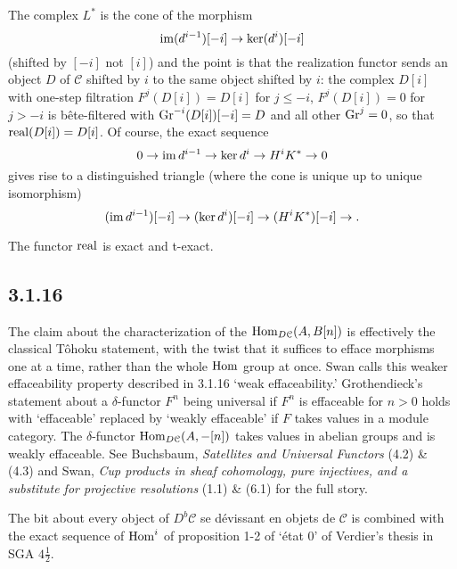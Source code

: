 \documentclass[deligne.tex]{subfiles}
\begin{document}
The complex $L^*$ is the cone of the morphism
\begin{equation*}
	\operatorname{im}(d^{i-1})[-i]\rightarrow\ker(d^i)[-i]
\end{equation*}
(shifted by $[-i]$ not $[i]$) and the point is that the realization functor
sends an object $D$ of $\mathcal C$ shifted by $i$ to the same object 
shifted by $i$: the complex $D[i]$ with one-step filtration
$F^j(D[i])=D[i]$ for $j\leq-i$, $F^j(D[i])=0$ for $j>-i$ is
bête-filtered with $\operatorname{Gr}^{-i}(D[i])[-i]=D$ and all other $\operatorname{Gr}^j=0$, so that
$\operatorname{real}(D[i])=D[i]$. Of course, the exact sequence
\begin{equation*}
	0\rightarrow\operatorname{im} d^{i-1}\rightarrow\ker d^i\rightarrow H^iK^*\rightarrow 0
\end{equation*}
gives rise to a distinguished triangle (where the cone is unique up to
unique isomorphism)
\begin{equation*}
	(\operatorname{im} d^{i-1})[-i]\rightarrow(\ker d^i)[-i]\rightarrow (H^iK^*)[-i]\rightarrow.
\end{equation*}
\begin{remark}
	The functor $\operatorname{real}$ is exact and t-exact.
\end{remark}

\subsection*{3.1.16}
The claim about the characterization of the $\operatorname{Hom}_{D\mathcal C}(A,B[n])$
is effectively the classical Tôhoku statement, with the twist that it
suffices to efface morphisms one at a time, rather than the whole $\operatorname{Hom}$
group at once. Swan calls this weaker effaceability property described in
3.1.16 `weak effaceability.'
Grothendieck's statement about a $\delta$-functor $F^n$ being universal if
$F^n$ is effaceable for $n>0$ holds with `effaceable' replaced by `weakly
effaceable' if $F$ takes values in a module category. The $\delta$-functor
$\operatorname{Hom}_{D\mathcal C}(A,-[n])$ takes values in abelian groups and is weakly
effaceable.
See Buchsbaum, \emph{Satellites and Universal Functors} (4.2) \& (4.3) and
Swan, \emph{Cup products in sheaf cohomology, pure injectives, and a substitute for projective resolutions} (1.1) \& (6.1) for the full story.

The bit about every object of $D^b\mathcal C$ se dévissant en objets de
$\mathcal C$ is combined with the exact sequence of $\operatorname{Hom}^i$ of
proposition 1-2 of `état 0' of Verdier's thesis in SGA $4\frac12$.
\end{document}
